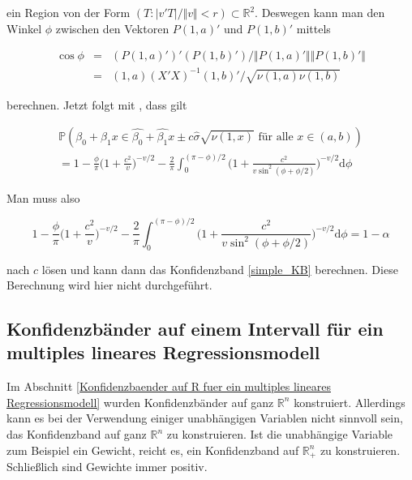 \documentclass[12pt,a4paper]{article}
\theoremstyle{definition}
\theoremstyle{definition}
\theoremstyle{definition}
\begin{document}
ein Region von der Form $(T : \vert v'T \vert / \Vert v \Vert < r) \subset \mathbb{R}^2$. Deswegen kann man den Winkel $\phi$ zwischen den Vektoren $P(1,a)'$ und $P(1,b)'$ mittels

\begin{eqnarray*}
\cos \phi &=& (P(1,a)')' (P(1,b)') / \Vert P(1,a)' \Vert \Vert P(1,b)' \Vert \\
&=& (1,a) (X'X)^{-1} (1,b)' / \sqrt{\nu(1,a) \nu(1,b)} 
\end{eqnarray*}

berechnen. Jetzt folgt mit \cite{Wynn71}, dass gilt
%
%
%


\begin{eqnarray*}
\mathbb{P}(\beta_0 + \beta_1 x \in \hat{\beta_0} + \hat{\beta_1} x \pm c \hat{\sigma} \sqrt{\nu(1,x)} \text{ für alle } x \in (a,b) ) \\
= 1 - \frac{\phi}{\pi} \biggl( 1 + \frac{c^2}{v} \biggr)^{ - v/2} - \frac{2}{\pi} \int^{(\pi - \phi)/2}_{0} \biggl( 1 + \frac{c^2}{v \sin^2(\phi + \phi/2)} \biggr)^{-v/2} \text{d} \phi
\end{eqnarray*}

Man muss also 

\begin{equation*}
1 - \frac{\phi}{\pi} \biggl( 1 + \frac{c^2}{v} \biggr)^{ - v/2} - \frac{2}{\pi} \int^{(\pi - \phi)/2}_{0} \biggl( 1 + \frac{c^2}{v \sin^2(\phi + \phi/2)} \biggr)^{-v/2} \text{d} \phi = 1 - \alpha
\end{equation*}

nach $c$ lösen und kann dann das Konfidenzband \eqref{simple_KB} berechnen. Diese Berechnung wird hier nicht durchgeführt.





\subsection{Konfidenzbänder auf einem Intervall für ein multiples lineares Regressionsmodell}
\label{Konfidenzbaender auf einem Intervall fuer ein multiples lineares Regressionsmodell}
Im Abschnitt \ref{Konfidenzbaender auf R fuer ein multiples lineares Regressionsmodell} wurden Konfidenzbänder auf ganz $\mathbb{R}^n$ konstruiert. Allerdings kann es bei der Verwendung einiger unabhängigen Variablen nicht sinnvoll sein, das Konfidenzband auf ganz $\mathbb{R}^{n}$ zu konstruieren. Ist die unabhängige Variable zum Beispiel ein Gewicht, reicht es, ein Konfidenzband auf $\mathbb{R}_{+}^{n}$ zu konstruieren. Schließlich sind Gewichte immer positiv.
\end{document}
